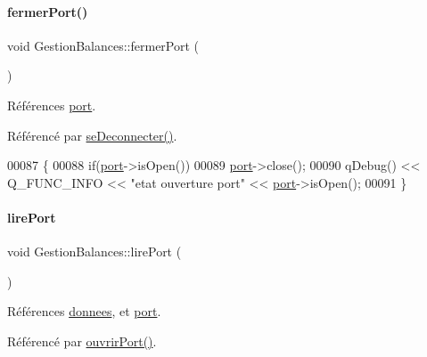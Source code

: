 \paragraph{\texorpdfstring{fermer\+Port()}{fermerPort()}}
{\footnotesize\ttfamily void Gestion\+Balances\+::fermer\+Port (\begin{DoxyParamCaption}{ }\end{DoxyParamCaption})\hspace{0.3cm}{\ttfamily [private]}}



Références \hyperlink{class_gestion_balances_a7e40205180eb65dab0b5cdebd628f794}{port}.



Référencé par \hyperlink{class_gestion_balances_a25880f41779aa8fdeac7ae972b09ff36}{se\+Deconnecter()}.


\begin{DoxyCode}
00087 \{
00088     \textcolor{keywordflow}{if}(\hyperlink{class_gestion_balances_a7e40205180eb65dab0b5cdebd628f794}{port}->isOpen())
00089         \hyperlink{class_gestion_balances_a7e40205180eb65dab0b5cdebd628f794}{port}->close();
00090     qDebug() << Q\_FUNC\_INFO << \textcolor{stringliteral}{"etat ouverture port"} << \hyperlink{class_gestion_balances_a7e40205180eb65dab0b5cdebd628f794}{port}->isOpen();
00091 \}
\end{DoxyCode}
\mbox{\label{class_gestion_balances_a4f3f6a424fce484321d239fa9f7fa15f}} 
\paragraph{\texorpdfstring{lire\+Port}{lirePort}}
{\footnotesize\ttfamily void Gestion\+Balances\+::lire\+Port (\begin{DoxyParamCaption}{ }\end{DoxyParamCaption})\hspace{0.3cm}{\ttfamily [slot]}}



Références \hyperlink{class_gestion_balances_acb44214ef5e441e89e0525f567079af3}{donnees}, et \hyperlink{class_gestion_balances_a7e40205180eb65dab0b5cdebd628f794}{port}.



Référencé par \hyperlink{class_gestion_balances_a8d7031310e6b9530c0a9e47c142aaf39}{ouvrir\+Port()}.


